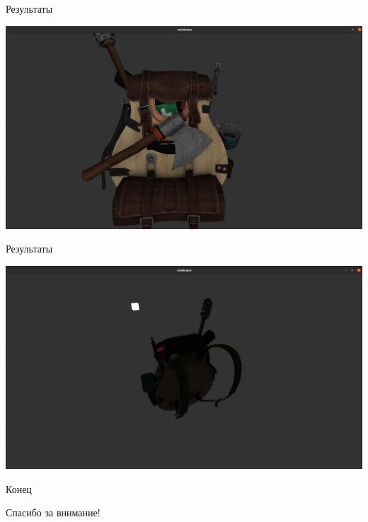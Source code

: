 \documentclass{beamer}
\begin{document}
\begin{frame}{Результаты}
    \begin{center}
    \includegraphics[width=1 \linewidth]{backpack_light.png}
    \end{center}
\end{frame}

\begin{frame}{Результаты}
    \begin{center}
    \includegraphics[width=1 \linewidth]{backpack_dark.png}
    \end{center}
\end{frame}

\begin{frame}{Конец}
    \begin{center}
    Спасибо за внимание!
    \end{center}
\end{frame}
\end{document}
